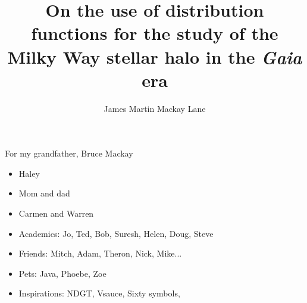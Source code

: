 \documentclass{ut-thesis}
\author{James Martin Mackay Lane}
\title{On the use of distribution functions for the study of the Milky Way stellar halo in the \textit{Gaia} era}
\begin{document}
\frontmatter
\maketitle

\begin{abstract}
    
\end{abstract}

\begin{dedication}
    For my grandfather, Bruce Mackay
\end{dedication}

\begin{acknowledgements}
    \begin{itemize}
        \item Haley
        \item Mom and dad
        \item Carmen and Warren
        \item Academics: Jo, Ted, Bob, Suresh, Helen, Doug, Steve
        \item Friends: Mitch, Adam, Theron, Nick, Mike...
        \item Pets: Java, Phoebe, Zoe
        \item Inspirations: NDGT, Vsauce, Sixty symbols, 
    \end{itemize}
\end{acknowledgements}

\tableofcontents
\listoftables
\listoffigures

\mainmatter












\appendix

\backmatter
\printbibliography[heading=bibintoc]

\end{document}
